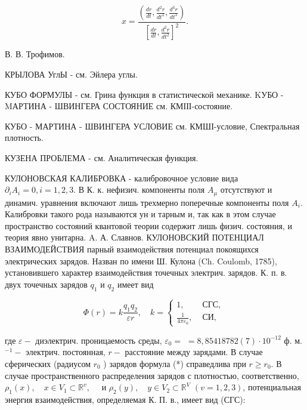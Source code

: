 \documentclass[10pt]{article}
\begin{document}
\[

x=\frac{\left(\frac{d r}{d t}, \frac{d^{2} r}{d t^{2}}, \frac{d^{3} r}{d t^{3}}\right)}{\left[\frac{d r}{d t}, \frac{d^{2} r}{d t^{2}}\right]^{2}} .

\]



В. В. Трофимов.



КРЫЛОВА УглЫ - см. Эйлера углы.



КУБО ФОРМУЛЫ - см. Грина функция в статистической механике. KУБО - MАРТИНА - ШВИНГЕРА СОСТОЯНИЕ см. КМІІІ-состояние.



КУБО - МАРТИНА - ШВИНГЕРА УСЛОВИЕ см. КМШІ-условие, Спектральная плотность.



КУЗЕНА ПРОБЛЕМА - см. Аналитическая функция.



КУЛОНОВСКАЯ КАЛИБРОВКА - калибровочное условие вида $\partial_{i} A_{i}=0, i=1,2,3$. В К. к. нефизич. компоненты поля $A_{\mu}$ отсутствуют и динамич. уравнения включают лишь трехмерно поперечные компоненты поля $A_{i}$. Калибровки такого рода называются ун и тарным и, так как в этом случае пространство состояний квантовой теории содержит лишь физич. состояния, и теория явно унитарна. A. А. Славнов. КУЛОНОВСКИЙ ПОТЕНЦИАЛ ВЗАИМОДЕЙСТВИЯ парный взаимодействия потенциал покоящихся электрических зарядов. Назван по имени Ш. Кулона (Ch. Coulomb, 1785), установившего характер взаимодействия точечных электрич. зарядов. К. п. в. двух точечных зарядов $q_{1}$ и $q_{2}$ имеет вид



\[

\Phi(r)=k \frac{q_{1} q_{2}}{\varepsilon r}, \quad k= \begin{cases}1, & \text { СГС, } \\ \frac{1}{4 \pi \varepsilon_{0}}, & \text { СИ, }\end{cases}

\]



где $\varepsilon-$ диэлектрич. проницаемость среды, $\varepsilon_{0}=$ $=8,85418782(7) \cdot 10^{-12}$ ф. м. ${ }^{-1}-$ электрич. постоянная, $r-$ расстояние между зарядами. В случае сферических (радиусом $r_{0}$ ) зарядов формула (*) справедлива при $r \geqslant r_{0}$. В случае пространственного распределения зарядов с плотностью, соответственно, $\rho_{1}(x), \quad x \in V_{1} \subset \mathbb{R}^{v}, \quad$ и $\rho_{2}(y), \quad y \in V_{2} \subset \mathbb{R}^{V}$ $(v=1,2,3)$, потенциальная энергия взаимодействия, определяемая К. П. в., имеет вид (СГС):
\end{document}

